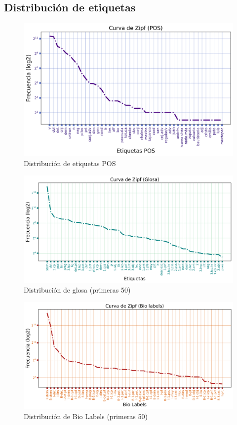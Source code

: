 \documentclass[letterpaper,12pt,oneside]{book}
\begin{document}
\subsection{Distribución de etiquetas}

\begin{figure}[h]
	\centering
	\includegraphics[width=\textwidth]{zipf_pos}
	\caption{Distribución de etiquetas POS}
\end{figure}

\begin{figure}[h]
	\centering
	\includegraphics[width=\textwidth]{zipf_gloss}
	\caption{Distribución de glosa (primeras 50)}
\end{figure}

\begin{figure}[h]
	\centering
	\includegraphics[width=\textwidth]{zipf_bio}
	\caption{Distribución de Bio Labels (primeras 50)}
\end{figure}
\end{document}
